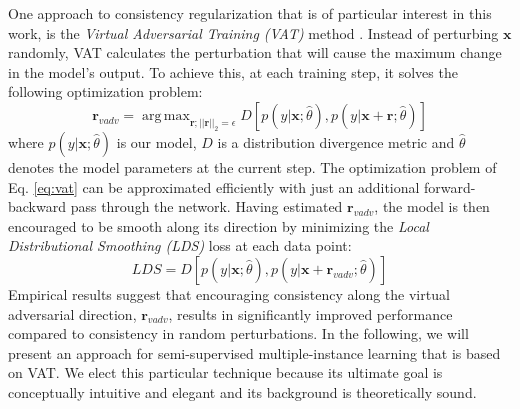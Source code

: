 \documentclass[journal,twoside,web]{ieeecolor}
\DeclareMathOperator*{\argmax}{arg\,max}
\begin{document}
One approach to consistency regularization that is of particular interest in this work,
is the \emph{Virtual Adversarial Training (VAT)} method \cite{Miyato2016a}.
Instead of perturbing $\mathbf{x}$ randomly, VAT calculates
the perturbation that will cause the 
maximum change in the model's output. 
To achieve this, at each training step, it solves
the following optimization problem:
\begin{equation}
\mathbf{r}_{vadv} = \argmax_{\mathbf{r} ; ||\mathbf{r}||_2 = \epsilon} 
D\left[p(y|\mathbf{x}; \hat{\theta}), p(y|\mathbf{x+r}; \hat{\theta})\right]
\label{eq:vat}
\end{equation}
where $p(y|\mathbf{x}; \hat{\theta})$ is our model, $D$ is 
a distribution divergence metric and $\hat{\theta}$ denotes the
model parameters at the current step. 
The optimization problem of Eq. \ref{eq:vat} 
can be approximated efficiently
with just an additional forward-backward pass through the network.
Having estimated $\mathbf{r}_{vadv}$,
the model is then encouraged to be smooth along its direction by minimizing the
\emph{Local Distributional Smoothing (LDS)} loss at each data point:
\begin{equation}
LDS = D\left[p(y|\mathbf{x}; \hat{\theta}), p(y|\mathbf{x}+\mathbf{r}_{vadv}; \hat{\theta})\right]
\end{equation}
Empirical results suggest that encouraging consistency 
along the virtual adversarial
direction, $\mathbf{r}_{vadv}$, results in 
significantly improved performance compared
to consistency in random perturbations.
In the following, we will present an approach 
for semi-supervised multiple-instance learning
that is based on VAT. We elect this particular technique because its
ultimate goal is conceptually intuitive and elegant and its background is
theoretically sound.
\end{document}
